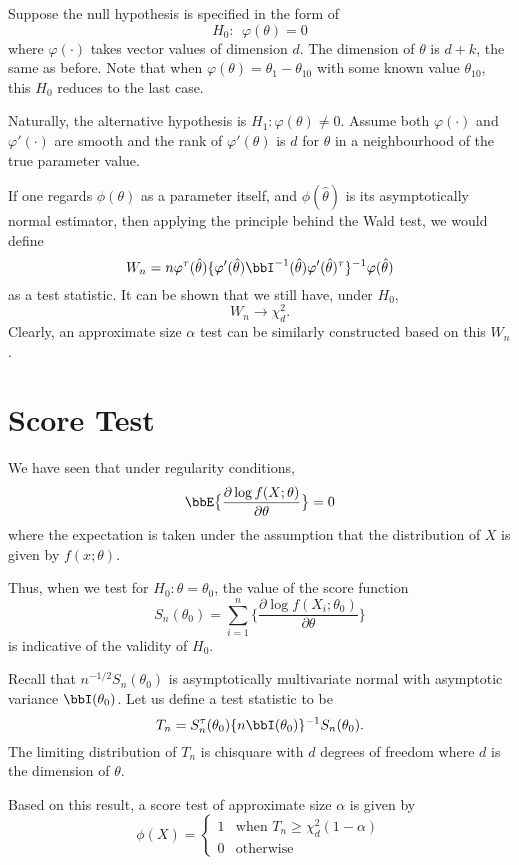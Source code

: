 Suppose the null hypothesis is specified in the form of
\[
H_0: ~~\varphi(\theta) = 0
\]
where $\varphi(\cdot)$ takes vector values of dimension $d$.
The dimension of $\theta$ is $d+k$, the same as before.
Note that when $\varphi(\theta) = \theta_1 - \theta_{10}$ with some known
value $\theta_{10}$, this $H_0$ reduces to the
last case. 

Naturally, the alternative hypothesis is $H_1: \varphi(\theta) \neq 0$.
Assume both $\varphi(\cdot)$ and $\varphi'(\cdot)$ are smooth and
the rank of $\varphi'(\theta)$
is $d$ for $\theta$ in a neighbourhood of the true parameter value.

If one regards $\phi(\theta)$ as a parameter itself, and $\phi(\hat \theta)$
is its asymptotically normal estimator, then applying the principle
behind the Wald test, we would define
\[
W_n =
n \varphi^\tau (\hat \theta) 
\{\varphi'(\hat \theta) \bbI^{-1}(\hat \theta)\varphi'(\hat \theta)^\tau \}^{-1}
\varphi(\hat \theta)
\]
as a test statistic.
It can be shown that we still have, under $H_0$,
\[
W_n \to \chi_d^2.
\]
Clearly, an approximate size $\alpha$ test can be similarly
constructed based on this $W_n$.

\section{Score Test}
We have seen that under regularity conditions,
\[
\bbE \big \{ \frac{\partial \log f(X; \theta) }{ \partial \theta } \big \} = 0
\]
where the expectation is taken under the assumption that
the distribution of $X$ is given by $f(x; \theta)$.

Thus, when we test for $H_0: \theta = \theta_0$, 
the value of the score function
\[
S_n(\theta_0) 
= 
\sum_{i=1}^n \big \{ \frac{\partial \log f(X_i; \theta_0) }{ \partial \theta} \big \}
\]
is indicative of the validity of $H_0$.

Recall that $n^{-1/2} S_n(\theta_0)$ is asymptotically multivariate normal
with asymptotic variance $\bbI(\theta_0)$.
Let us define a test statistic to be
\[
T_n = S_n^\tau (\theta_0) \{n \bbI(\theta_0)\}^{-1} S_n(\theta_0).
\]
The limiting distribution of $T_n$ is chisquare with $d$ degrees
of freedom where $d$ is the dimension of $\theta$.

Based on this result, a score test of approximate size $\alpha$
is given by
\[
\phi(X) = 
\left \{
\begin{array} {ll}
1 & \mbox{when  } T_n \geq \chi_d^2(1 - \alpha) \\
0 & \mbox{otherwise}
\end{array}
\right .
\]

